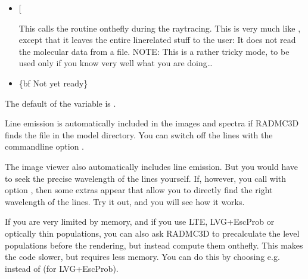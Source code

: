 \documentclass[letterpaper,10pt,english]{sphinxmanual}
\begin{document}
\begin{itemize}
\item {} 
 {[}\sphinxcode{\sphinxupquote{lines\_mode=\sphinxhyphen{}10}}{]}

This calls the routine 
on\sphinxhyphen{}the\sphinxhyphen{}fly during the ray\sphinxhyphen{}tracing. This is very much like
, except that it leaves the
entire line\sphinxhyphen{}related stuff to the user: It does not read the molecular
data from a file. NOTE: This is a rather tricky mode, to be used only
if you know very well what you are doing…

\item {} 
 \{bf Not yet ready\}

\end{itemize}

The default of the  variable is .

 Line emission is automatically included in the images and spectra if
RADMC\sphinxhyphen{}3D finds the file  in the model directory. You can switch off
the lines with the command\sphinxhyphen{}line option .

 The  image viewer also automatically includes line
emission. But you would have to seek the precise wavelength of the lines
yourself. If, however, you call  with option , then some
extras appear that allow you to directly find the right wavelength of the
lines. Try it out, and you will see how it works.

 If you are very limited by memory, and if you use LTE, LVG+EscProb
or optically thin populations, you can also ask RADMC\sphinxhyphen{}3D to  precalculate
the level populations before the rendering, but instead compute them
on\sphinxhyphen{}the\sphinxhyphen{}fly. This makes the code slower, but requires less memory.  You can do
this by choosing e.g. instead of  (for
LVG+EscProb).
\end{document}

